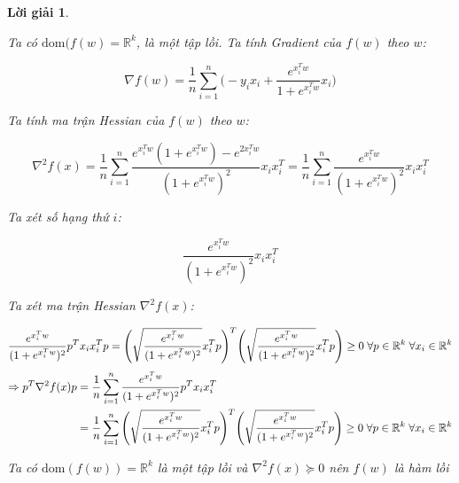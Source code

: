 \documentclass[14pt, a4paper]{article}
\theoremstyle{sltheorem}
\theoremstyle{soltheorem}
\newtheorem*{loigiai}{Lời giải}
\begin{document}
\begin{loigiai}
\begin{enumerate} [wide, labelwidth=!, labelindent=0pt,label=\textbf{\arabic*}.]
            Ta có $\mathrm{dom}(f(w)=\mathbb{R}^{k}$, là một tập lồi. Ta tính Gradient của $f(w)$ theo $w$:

            \begin{equation*}
                \nabla f(w)=\dfrac{1}{n}\sum_{i=1}^n \Big( -y_i x_i + \dfrac{e^{x_i^Tw}}{1 + e^{x_i^T w}}x_i \Big)
            \end{equation*}

            Ta tính ma trận Hessian của $f(w)$ theo $w$:

            \begin{equation*}
                \nabla^2 f(x) = \dfrac{1}{n}\sum_{i=1}^n \dfrac{e^{x_i^Tw}(1 + e^{x_i^T w})-e^{2x_i^T w}}{(1 + e^{x_i^T w})^2}x_i x_i^T=\dfrac{1}{n}\sum_{i=1}^n \dfrac{e^{x_i^Tw}}{(1 + e^{x_i^T w})^2}x_i x_i^T
            \end{equation*}

            Ta xét số hạng thứ $i$:

            \begin{equation*}
                \dfrac{e^{x_i^Tw}}{(1 + e^{x_i^T w})^2}x_i x_i^T
            \end{equation*}

            Ta xét ma trận Hessian $\nabla^2 f(x)$:

            \begin{equation*}
                \dfrac{e^{x_i^Tw}}{(1 + e^{x_i^T w})^2}p^Tx_i x_i^T p=\Bigg(\sqrt{\dfrac{e^{x_i^Tw}}{(1 + e^{x_i^T w})^2}} x_i^Tp\Bigg)^T\Bigg(\sqrt{\dfrac{e^{x_i^Tw}}{(1 + e^{x_i^T w})^2}} x_i^Tp\Bigg)\geq 0 \thickspace \forall p \in \mathbb{R}^{k} \thickspace \forall x_i \in \mathbb{R}^{k}
            \end{equation*}
            \begin{equation*}
                \begin{aligned}
                    \Rightarrow p^T \nabla^2 f(x)p&=\dfrac{1}{n}\sum_{i=1}^n \dfrac{e^{x_i^Tw}}{(1 + e^{x_i^T w})^2}p^Tx_i x_i^T\\
                    &=\dfrac{1}{n}\sum_{i=1}^n \Bigg(\sqrt{\dfrac{e^{x_i^Tw}}{(1 + e^{x_i^T w})^2}} x_i^Tp\Bigg)^T\Bigg(\sqrt{\dfrac{e^{x_i^Tw}}{(1 + e^{x_i^T w})^2}} x_i^Tp\Bigg)\geq 0 \thickspace \forall p \in \mathbb{R}^{k} \thickspace \forall x_i \in \mathbb{R}^{k}
                \end{aligned}
            \end{equation*}

            Ta có $\mathrm{dom}(f(w))=\mathbb{R}^{k}$ là một tập lồi và $\nabla^2 f(x) \succeq 0$ nên $f(w)$ là hàm lồi
        \end{enumerate}
        

    \end{loigiai}
\end{document}
